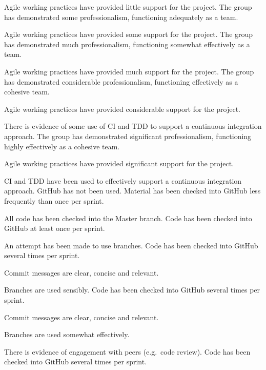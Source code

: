 \documentclass{../../fal_assignment}
\begin{document}
\begin{markingrubric}
            \par Agile working practices have provided little support for the project.
        \grade The group has demonstrated some professionalism,
            functioning adequately as a team.
            \par Agile working practices have provided some support for the project.
        \grade The group has demonstrated much professionalism,
            functioning somewhat effectively as a team.
            \par Agile working practices have provided much support for the project.
        \grade The group has demonstrated considerable professionalism,
            functioning effectively as a cohesive team.
            \par Agile working practices have provided considerable support for the project.
            \par There is evidence of some use of CI and TDD to support a continuous integration approach.
        \grade The group has demonstrated significant professionalism,
            functioning highly effectively as a cohesive team.
            \par Agile working practices have provided significant support for the project.
            \par CI and TDD have been used to effectively support a continuous integration approach.
%
        \grade\fail GitHub has not been used.
        \grade Material has been checked into GitHub less frequently than once per sprint.
            \par All code has been checked into the Master branch.
        \grade Code has been checked into GitHub at least once per sprint.
            \par An attempt has been made to use branches.
        \grade Code has been checked into GitHub several times per sprint.
            \par Commit messages are clear, concise and relevant.
            \par Branches are used sensibly.
        \grade Code has been checked into GitHub several times per sprint.
            \par Commit messages are clear, concise and relevant.
            \par Branches are used somewhat effectively.
            \par There is evidence of engagement with peers (e.g.\ code review).
        \grade Code has been checked into GitHub several times per sprint.

\end{markingrubric}
\end{document}
